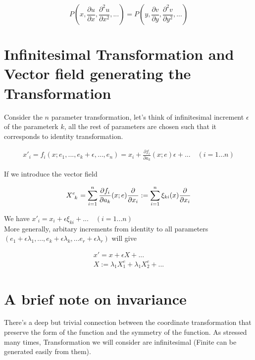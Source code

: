 \documentclass{report}
\begin{document}
$$ P\left(x,\frac{\partial u}{\partial x}, \frac{\partial ^2 u}{\partial x^2},...\right) = P\left(y,\frac{\partial v}{\partial y}, \frac{\partial ^2 v}{\partial y^2},...\right)$$

\section{Infinitesimal Transformation and Vector field generating the Transformation}

Consider the $n$ parameter transformation, let's think of infinitesimal increment $\epsilon$ of the parameterk $k$, all the rest of parameters are chosen such that it corresponds to identity transformation.

\begin{align}
x'_i = f_i(x;e_1,...,e_k+\epsilon,...,e_n)
= x_i + \frac{\partial f_i}{\partial a_k} (x;e)\epsilon + ... \quad(i = 1...n)
\end{align}

\noindent If we introduce the vector field

$$X\indices{^e_k} = \sum_{i=1}^{n} \frac{\partial f_i}{\partial a_k}(x;e) \frac{\partial}{\partial x_i} := \sum_{i=1}^{n}\xi_{ki}(x)\frac{\partial}{\partial x_i}$$

\noindent We have $x'_i = x_i + \epsilon \xi_{ki} + ... \quad (i=1...n)$\\

\noindent More generally, arbitary increments from identity to all parameters $(e_1 + \epsilon\lambda_1,...,e_k+\epsilon\lambda_k,...e_r+\epsilon\lambda_r)$ will give

\begin{gather}
x' = x + \epsilon X +...\\
X := \lambda_1 X_1^e + \lambda_1 X_2^e+...
\end{gather}

\section{A brief note on invariance}

There's a deep but trivial connection between the coordinate transformation that preserve the form of the function and the symmetry of the function. As stressed many times, Transformation we will consider are infinitesimal (Finite can be generated easily from them).\\
\end{document}

